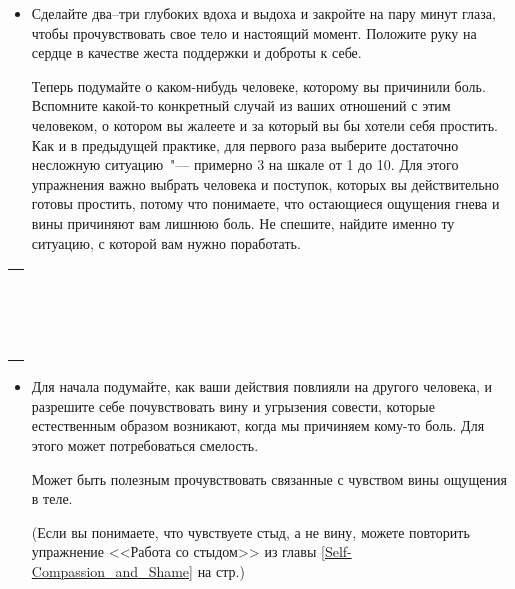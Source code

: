 \begin{itemize}
	\item Сделайте два--три глубоких вдоха и выдоха и закройте на пару минут глаза, чтобы прочувствовать свое тело и настоящий момент. Положите руку на сердце в качестве жеста поддержки и доброты к себе.
	
	\itemWritingHand Теперь подумайте о каком-нибудь человеке, которому вы причинили боль. Вспомните какой-то конкретный случай из ваших отношений с этим человеком, о котором вы жалеете и за который вы бы хотели себя простить. Как и в предыдущей практике, для первого раза выберите достаточно несложную ситуацию~"--- примерно 3 на шкале от 1 до 10. Для этого упражнения важно выбрать человека и поступок, которых вы действительно готовы простить, потому что понимаете, что остающиеся ощущения гнева и вины причиняют вам лишнюю боль. Не спешите, найдите именно ту ситуацию, с которой вам нужно поработать.	
\end{itemize}

\setlength{\extrarowheight}{2mm}
\begin{tabularx}{0.96\textwidth}{X}
	\\
	\arrayrulecolor{gray}\hline\\
	\hline\\
	\hline\\
	\hline\\
	\hline\\
	\hline\\	
	\hline\\
	\hline\\
	\hline\\
	\hline\\
	\hline\\
	\hline\\
	\hline\\
	\hline\\
	\hline\\
	\hline\\
\end{tabularx}
\setlength{\extrarowheight}{0mm}



\begin{itemize}
	\item Для начала подумайте, как ваши действия повлияли на другого человека, и разрешите себе почувствовать вину и угрызения совести, которые естественным образом возникают, когда мы причиняем кому-то боль. Для этого может потребоваться смелость. 

	Может быть полезным прочувствовать связанные с чувством вины ощущения в теле.
	
	(Если вы понимаете, что чувствуете стыд, а не вину, можете повторить упражнение <<Работа со стыдом>> из главы \ref{Self-Compassion_and_Shame} на стр.\:\pageref{IP:Working_with_Shame})
\end{itemize}

